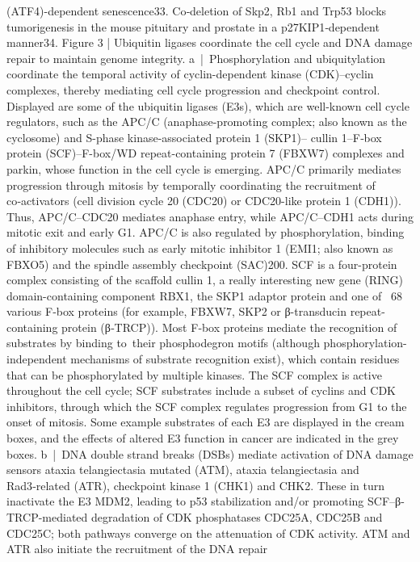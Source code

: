 (ATF4)-dependent senescence33. Co‑deletion of Skp2,
Rb1 and Trp53 blocks tumorigenesis in the mouse
­pituitary and prostate in a p27KIP1‑dependent manner34.
Figure 3 | Ubiquitin ligases coordinate the cell cycle and DNA damage repair to
maintain genome integrity. a | Phosphorylation and ubiquitylation coordinate the
temporal activity of cyclin-dependent kinase (CDK)–cyclin complexes, thereby mediating
cell cycle progression and checkpoint control. Displayed are some of the ubiquitin ligases
(E3s), which are well-known cell cycle regulators, such as the APC/C (anaphase-promoting
complex; also known as the cyclosome) and S-phase kinase-associated protein 1 (SKP1)–
cullin 1–F‑box protein (SCF)–F-box/WD repeat-containing protein 7 (FBXW7) complexes
and parkin, whose function in the cell cycle is emerging. APC/C primarily mediates
progression through mitosis by temporally coordinating the recruitment of co‑activators
(cell division cycle 20 (CDC20) or CDC20-like protein 1 (CDH1)). Thus, APC/C–CDC20
mediates anaphase entry, while APC/C–CDH1 acts during mitotic exit and early G1. APC/C
is also regulated by phosphorylation, binding of inhibitory molecules such as early mitotic
inhibitor 1 (EMI1; also known as FBXO5) and the spindle assembly checkpoint (SAC)200. SCF
is a four-protein complex consisting of the scaffold cullin 1, a really interesting new gene
(RING) domain-containing component RBX1, the SKP1 adaptor protein and one of ~68
various F‑box proteins (for example, FBXW7, SKP2 or β-transducin repeat-containing
protein (β‑TRCP)). Most F‑box proteins mediate the recognition of substrates by binding
to their phosphodegron motifs (although phosphorylation-independent mechanisms of
substrate recognition exist), which contain residues that can be phosphorylated by
multiple kinases. The SCF complex is active throughout the cell cycle; SCF substrates
include a subset of cyclins and CDK inhibitors, through which the SCF complex regulates
progression from G1 to the onset of mitosis. Some example substrates of each E3 are
displayed in the cream boxes, and the effects of altered E3 function in cancer are indicated
in the grey boxes. b | DNA double strand breaks (DSBs) mediate activation of DNA damage
sensors ataxia telangiectasia mutated (ATM), ataxia telangiectasia and Rad3‑related (ATR),
checkpoint kinase 1 (CHK1) and CHK2. These in turn inactivate the E3 MDM2, leading to
p53 stabilization and/or promoting SCF–β-TRCP-mediated degradation of CDK
phosphatases CDC25A, CDC25B and CDC25C; both pathways converge on the
attenuation of CDK activity. ATM and ATR also initiate the recruitment of the DNA repair
